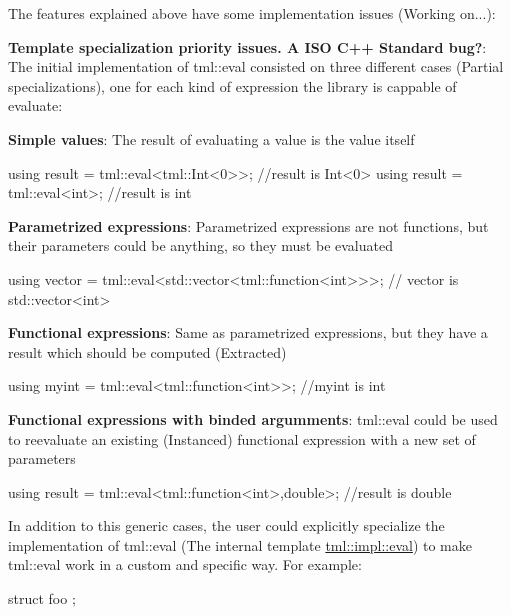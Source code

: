 The features explained above have some implementation issues (Working on...)\+:


\begin{DoxyItemize}
\item {\bfseries Template specialization priority issues. A I\+S\+O C++ Standard bug?}\+: The initial implementation of {\ttfamily tml\+::eval} consisted on three different cases (Partial specializations), one for each kind of expression the library is cappable of evaluate\+:
\begin{DoxyEnumerate}
\item {\bfseries Simple values}\+: The result of evaluating a value is the value itself \begin{DoxyVerb} using result = tml::eval<tml::Int<0>>; //result is Int<0>
 using result = tml::eval<int>; //result is int
\end{DoxyVerb}

\item {\bfseries Parametrized expressions}\+: Parametrized expressions are not functions, but their parameters could be anything, so they must be evaluated \begin{DoxyVerb} using vector = tml::eval<std::vector<tml::function<int>>>; // vector is std::vector<int>
\end{DoxyVerb}

\item {\bfseries Functional expressions}\+: Same as parametrized expressions, but they have a result which should be computed (Extracted) \begin{DoxyVerb} using myint = tml::eval<tml::function<int>>; //myint is int
\end{DoxyVerb}

\item {\bfseries Functional expressions with binded argumments}\+: {\ttfamily tml\+::eval} could be used to reevaluate an existing (Instanced) functional expression with a new set of parameters \begin{DoxyVerb} using result = tml::eval<tml::function<int>,double>; //result is double
\end{DoxyVerb}

\end{DoxyEnumerate}

In addition to this generic cases, the user could explicitly specialize the implementation of {\ttfamily tml\+::eval} (The internal template {\ttfamily \hyperlink{structtml_1_1impl_1_1eval}{tml\+::impl\+::eval}}) to make {\ttfamily tml\+::eval} work in a custom and specific way. For example\+: \begin{DoxyVerb} struct foo {};


\end{DoxyVerb}
\end{DoxyItemize}
